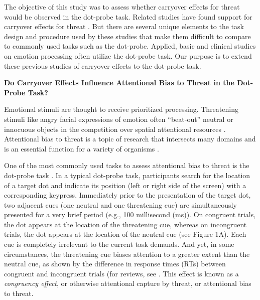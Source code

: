 \documentclass{article}
\begin{document}
The objective of this study was to assess whether carryover effects for threat would be observed in the dot-probe task. Related studies have found support for carryover effects for threat \parencite{Gladwin2017}\parencite{Gladwin2017}\parencite{Gladwin2019}\parencite{Gladwin2020}\parencite{Gladwin2019}. But there are several unique elements to the task design and procedure used by these studies that make them difficult to compare to commonly used tasks such as the dot-probe. Applied, basic and clinical studies on emotion processing often utilize the dot-probe task. Our purpose is to extend these previous studies of carryover effects to the dot-probe task. 



















\textbf{Do Carryover Effects Influence Attentional Bias to Threat in the Dot-Probe Task?}

Emotional stimuli are thought to receive prioritized processing. Threatening stimuli like angry facial expressions of emotion often “beat-out” neutral or innocuous objects \parencite{Becker2017}\parencite{Schubö2006} in the competition over spatial attentional resources \parencite{Desimone1995}. Attentional bias to threat is a topic of research that intersects many domains and is an essential function for a variety of organisms \parencite{Anderson2019}.

One of the most commonly used tasks to assess attentional bias to threat is the dot-probe task \parencite{MacLeod1986}. In a typical dot-probe task, participants search for the location of a target dot and indicate its position (left or right side of the screen) with a corresponding keypress. Immediately prior to the presentation of the target dot, two adjacent cues (one neutral and one threatening cue) are simultaneously presented for a very brief period (e.g., 100 millisecond (ms)). On congruent trials, the dot appears at the location of the threatening cue, whereas on incongruent trials, the dot appears at the location of the neutral cue (see Figure 1A). Each cue is completely irrelevant to the current task demands. And yet, in some circumstances, the threatening cue biases attention to a greater extent than the neutral cue, as shown by the difference in response times (RTs) between congruent and incongruent trials (for reviews, see \parencite{Carretié2014}\parencite{Imhoff2019}. This effect is known as a \emph{congruency effect}, or otherwise attentional capture by threat, or attentional bias to threat.
\end{document}
